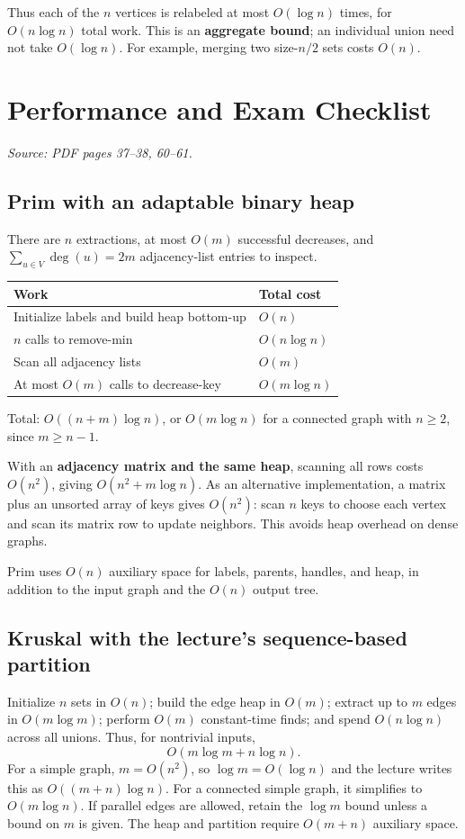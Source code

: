 \documentclass[11pt,letterpaper]{article}
\newcommand{\sourcepages}[1]{\textit{Source: PDF pages #1.}}
\begin{document}
Thus each of the $n$ vertices is relabeled at most $O(\log n)$ times, for $O(n\log n)$ total work. This is an \textbf{aggregate bound}; an individual union need not take $O(\log n)$. For example, merging two size-$n/2$ sets costs $O(n)$.

\newpage
\section{Performance and Exam Checklist}
\sourcepages{37--38, 60--61}

\subsection{Prim with an adaptable binary heap}
There are $n$ extractions, at most $O(m)$ successful decreases, and $\sum_{u\in V}\deg(u)=2m$ adjacency-list entries to inspect.

\begin{center}
\begin{tabular}{ll}
\toprule
Work & Total cost \\
\midrule
Initialize labels and build heap bottom-up & $O(n)$ \\
$n$ calls to remove-min & $O(n\log n)$ \\
Scan all adjacency lists & $O(m)$ \\
At most $O(m)$ calls to decrease-key & $O(m\log n)$ \\
\bottomrule
\end{tabular}
\end{center}
Total: $\boxed{O((n+m)\log n)}$, or $O(m\log n)$ for a connected graph with $n\geq2$, since $m\geq n-1$.

With an \textbf{adjacency matrix and the same heap}, scanning all rows costs $O(n^2)$, giving $O(n^2+m\log n)$. As an alternative implementation, a matrix plus an unsorted array of keys gives $O(n^2)$: scan $n$ keys to choose each vertex and scan its matrix row to update neighbors. This avoids heap overhead on dense graphs.

Prim uses $O(n)$ auxiliary space for labels, parents, handles, and heap, in addition to the input graph and the $O(n)$ output tree.

\subsection{Kruskal with the lecture's sequence-based partition}
Initialize $n$ sets in $O(n)$; build the edge heap in $O(m)$; extract up to $m$ edges in $O(m\log m)$; perform $O(m)$ constant-time finds; and spend $O(n\log n)$ across all unions. Thus, for nontrivial inputs,
\[
 \boxed{O(m\log m+n\log n)}.
\]
For a simple graph, $m=O(n^2)$, so $\log m=O(\log n)$ and the lecture writes this as $O((m+n)\log n)$. For a connected simple graph, it simplifies to $O(m\log n)$. If parallel edges are allowed, retain the $\log m$ bound unless a bound on $m$ is given. The heap and partition require $O(m+n)$ auxiliary space.
\end{document}
